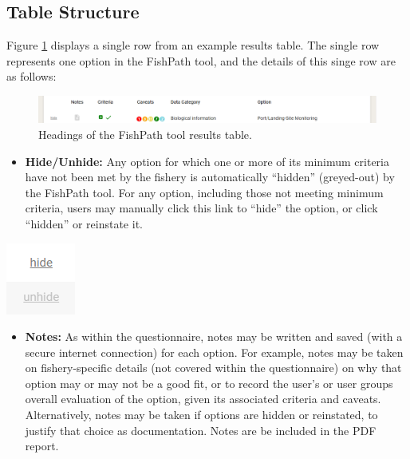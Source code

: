 \documentclass[11pt,]{book}
\providecommand{\tightlist}{%
  \setlength{\itemsep}{0pt}\setlength{\parskip}{0pt}}
\begin{document}
\hypertarget{table-structure}{%
\subsection{Table Structure}\label{table-structure}}

Figure \ref{fig:single-row} displays a single row from an example results table. The single row represents one option in the FishPath tool, and the details of this singe row are as follows:

\begin{figure}

{\centering \includegraphics[width=0.95\linewidth]{images/single-row} 

}

\caption{Headings of the FishPath tool results table.}\label{fig:single-row}
\end{figure}

\begin{itemize}
\tightlist
\item
  \textbf{Hide/Unhide:} Any option for which one or more of its minimum criteria have not been met by the fishery is automatically ``hidden'' (greyed-out) by the FishPath tool. For any option, including those not meeting minimum criteria, users may manually click this link to ``hide'' the option, or click ``hidden'' or reinstate it.
\end{itemize}

\begin{center}\includegraphics[width=0.1\linewidth]{images/hide} \end{center}

\begin{itemize}
\tightlist
\item
  \textbf{Notes:} As within the questionnaire, notes may be written and saved (with a secure internet connection) for each option. For example, notes may be taken on fishery-specific details (not covered within the questionnaire) on why that option may or may not be a good fit, or to record the user's or user groups overall evaluation of the option, given its associated criteria and caveats. Alternatively, notes may be taken if options are hidden or reinstated, to justify that choice as documentation. Notes are be included in the PDF report.
\end{itemize}
\end{document}
